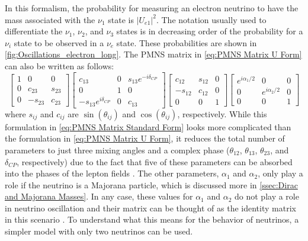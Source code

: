In this formalism, the probability for measuring an electron neutrino to have the mass associated with the $\nu_1$ state is $|U_{e1}|^2$. The notation usually used to differentiate the $\nu_1$, $\nu_2$, and $\nu_3$ states is in decreasing order of the probability for a $\nu_i$ state to be observed in a $\nu_e$ state.
These probabilities are shown in \autoref{fig:Oscillations_electron_long}.
The PMNS matrix in \autoref{eq:PMNS Matrix U Form} can also be written as follows: 
\begin{equation}\label{eq:PMNS Matrix Standard Form}
  \begin{bmatrix}
    1 & 0 & 0 \\
    0 & c_{23} & s_{23} \\
    0 & -s_{23} & c_{23}
  \end{bmatrix}
  \begin{bmatrix}
  c_{13} & 0 & s_{13}e^{-i\delta_{CP}} \\
  0 & 1 & 0 \\
  -s_{13}e^{i\delta_{CP}} & 0 & c_{13}
  \end{bmatrix}
  \begin{bmatrix}
  c_{12} & s_{12} & 0 \\
  -s_{12} & c_{12} & 0 \\
  0 & 0 & 1
  \end{bmatrix}
  \begin{bmatrix}
  e^{i\alpha_1/2} & 0 & 0 \\
  0 & e^{i\alpha_2/2} & 0 \\
  0 & 0 & 1
  \end{bmatrix}
\end{equation}
where $s_{ij}$ and $c_{ij}$ are $\sin(\theta_{ij})$ and $\cos(\theta_{ij})$, respectively.
While this formulation in \autoref{eq:PMNS Matrix Standard Form} looks more complicated than the formulation in \autoref{eq:PMNS Matrix U Form}, it reduces the total number of parameters to just three mixing angles and a complex phase ($\theta_{12}$, $\theta_{13}$, $\theta_{23}$, and $\delta_{CP}$, respectively) due to the fact that five of these parameters can be absorbed into the phases of the lepton fields \cite{Valle:2006}.
The other parameters, $\alpha_1$ and $\alpha_2$, only play a role if the neutrino is a Majorana particle, which is discussed more in \autoref{ssec:Dirac and Majorana Masses}.
In any case, these values for $\alpha_1$ and $\alpha_2$ do not play a role in neutrino oscillation and their matrix can be thought of as the identity matrix in this scenario \cite{BILENKY1980495}.
To understand what this means for the behavior of neutrinos, a simpler model with only two neutrinos can be used.
